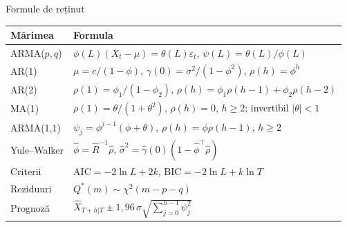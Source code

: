 \begin{frame}{Formule de reținut}
\itemsize{\small}
{\renewcommand{\arraystretch}{1.35}\begin{center}
\scriptsize
\begin{tabular}{ll}
\toprule
\textbf{Mărimea} & \textbf{Formula} \\
\midrule
ARMA($p,q$) & $\phi(L)(X_t - \mu) = \theta(L)\varepsilon_t$, \quad $\psi(L) = \theta(L)/\phi(L)$ \\
AR(1) & $\mu = c/(1 - \phi)$, \quad $\gamma(0) = \sigma^2/(1 - \phi^2)$, \quad $\rho(h) = \phi^h$ \\
AR(2) & $\rho(1) = \phi_1/(1 - \phi_2)$, \quad $\rho(h) = \phi_1\rho(h - 1) + \phi_2\rho(h - 2)$ \\
MA(1) & $\rho(1) = \theta/(1 + \theta^2)$, \quad $\rho(h) = 0$, $h \ge 2$; invertibil $|\theta| < 1$ \\
ARMA(1,1) & $\psi_j = \phi^{j-1}(\phi + \theta)$, \quad $\rho(h) = \phi\rho(h - 1)$, $h \ge 2$ \\
Yule--Walker & $\hat\phi = \hat R^{-1}\hat\rho$, \quad $\hat\sigma^2 = \hat\gamma(0)(1 - \hat\phi^\top\hat\rho)$ \\
Criterii & $\mathrm{AIC} = -2\ln L + 2k$, \quad $\mathrm{BIC} = -2\ln L + k\ln T$ \\
Reziduuri & $Q^*(m) \sim \chi^2(m - p - q)$ \\
Prognoză & $\hat X_{T+h|T} \pm 1{,}96\,\sigma\sqrt{\textstyle\sum_{j=0}^{h-1}\psi_j^2}$ \\
\bottomrule
\end{tabular}
\end{center}
}
\end{frame}

